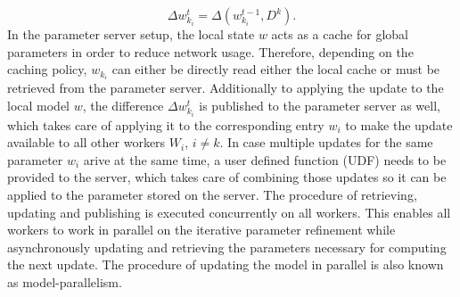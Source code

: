 \begin{equation}
\Delta w_{k_i}^{t} = \Delta(w_{k_i}^{t-1},D^k).
\label{eqn:local_delta_upd_param}
\end{equation}
In the parameter server setup, the local state $w$ acts as a cache for global parameters in order to reduce network usage.
Therefore, depending on the caching policy, $w_{k_i}$ can either be directly read either the local cache or must be retrieved from the parameter server.
Additionally to applying the update to the local model $w$, the difference $\Delta w_{k_i}^{t}$ is published to the parameter server as well, which takes care of applying it to the corresponding entry $w_i$ to make the update available to all other workers $W_i$, $i \neq k$.
In case multiple updates for the same parameter $w_i$ arive at the same time, a user defined function (UDF) needs to be provided to the server, which takes care of combining those updates so it can be applied to the parameter stored on the server.
The procedure of retrieving, updating and publishing is executed concurrently on all workers.
This enables all workers to work in parallel on the iterative parameter refinement while asynchronously updating and retrieving the parameters necessary for computing the next update.
The procedure of updating the model in parallel is also known as model-parallelism.

